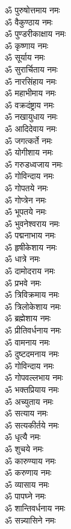 \begin{multicols}{2}
\begin{flushleft}
ॐ पुरुषोत्तमाय नमः\\
ॐ वैकुण्ठाय नमः\\
ॐ पुण्डरीकाक्षाय नमः\\
ॐ कृष्णाय नमः\hfill{}\\
ॐ सूर्याय नमः\\
ॐ सुरार्चिताय नमः\\
ॐ नारसिंहाय नमः\\
ॐ महाभीमाय नमः\\
ॐ वक्रदंष्ट्राय नमः\\
ॐ नखायुधाय नमः\\
ॐ आदिदेवाय नमः\\
ॐ जगत्कर्ते नमः\\
ॐ योगीशाय नमः\\
ॐ गरुडध्वजाय नमः\hfill{}\\
ॐ गोविन्दाय नमः\\
ॐ गोपतये नमः\\
ॐ गोप्त्रेन नमः\\
ॐ भूपतये नमः\\
ॐ भुवनेश्वराय नमः\\
ॐ पद्मनाभाय नमः\\
ॐ हृषीकेशाय नमः\\
ॐ धात्रे नमः\\
ॐ दामोदराय नमः\\
ॐ प्रभवे नमः\hfill{}\\
ॐ त्रिविक्रमाय नमः\\
ॐ त्रिलोकेशाय नमः\\
ॐ ब्रह्मेशाय नमः\\
ॐ प्रीतिवर्धनाय नमः\\
ॐ वामनाय नमः\\
ॐ दुष्टदमनाय नमः\\
ॐ गोविन्दाय नमः\\
ॐ गोपवल्लभाय नमः\\
ॐ भक्तप्रियाय नमः\\
ॐ अच्युताय नमः\hfill{}\\
ॐ सत्याय नमः\\
ॐ सत्यकीर्तये नमः\\
ॐ धृत्यै नमः\\
ॐ शुचये नमः\\
ॐ कारुण्याय नमः\\
ॐ करुणाय नमः\\
ॐ व्यासाय नमः\\
ॐ पापघ्ने नमः\\
ॐ शान्तिवर्धनाय नमः\\
ॐ सन्न्यासिने नमः\hfill{}\\

\end{flushleft}
\end{multicols}
